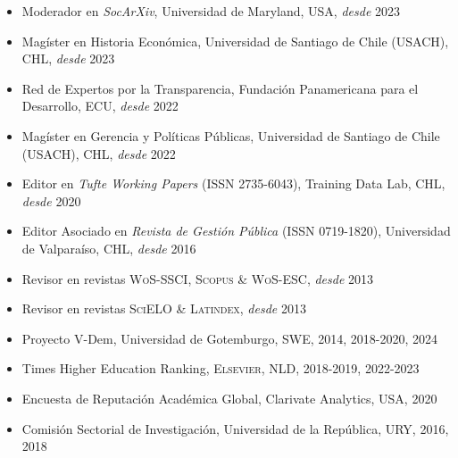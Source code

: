 





\begin{publications}

\begin{itemize}
\item{\small Moderador en {\itshape SocArXiv}, Universidad de Maryland, USA, {\itshape desde} 2023}
\item{\small Magíster en Historia Económica, Universidad de Santiago de Chile (USACH), CHL, {\itshape desde} 2023}
\item{\small Red de Expertos por la Transparencia, Fundación Panamericana para el Desarrollo, ECU, {\itshape desde} 2022}
\item{\small Magíster en Gerencia y Políticas Públicas, Universidad de Santiago de Chile (USACH), CHL, {\itshape desde} 2022}
\item{\small Editor en {\itshape Tufte Working Papers} (ISSN 2735-6043), Training Data Lab, CHL, {\itshape desde} 2020}
\item{\small Editor Asociado en {\itshape Revista de Gestión Pública} (ISSN 0719-1820), Universidad de Valparaíso, CHL, {\itshape desde} 2016}
\item{\small Revisor en revistas {\scshape WoS-SSCI}, {\scshape Scopus} \& {\scshape WoS-ESC}, {\itshape desde} 2013}
\item{\small Revisor en revistas {\scshape SciELO} \& {\scshape Latindex}, {\itshape desde} 2013}
\item{\small Proyecto V-Dem, Universidad de Gotemburgo, SWE, 2014, 2018-2020, 2024}
\item{\small Times Higher Education Ranking, {\scshape Elsevier}, NLD, 2018-2019, 2022-2023}
\item{\small Encuesta de Reputación Académica Global, Clarivate Analytics, USA, 2020}
\item{\small Comisión Sectorial de Investigación, Universidad de la República, URY, 2016, 2018}
\end{itemize}

\vspace{1mm}
\end{publications}
